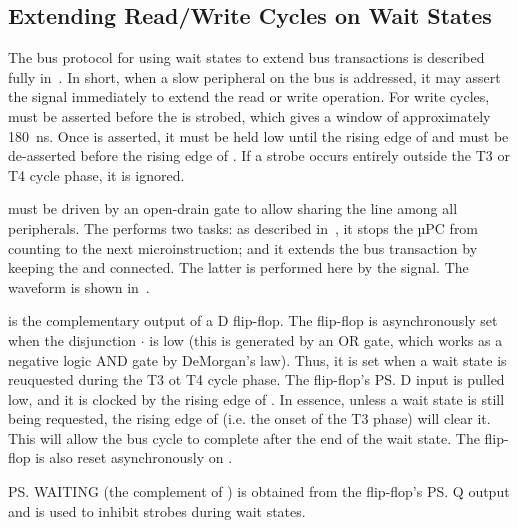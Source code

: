 \subsection{Extending Read/Write Cycles on Wait States}
\label{sec:dbus-driver-waiting}

The bus protocol for using wait states to extend bus transactions is described
fully in~. In short, when a slow peripheral on the bus is
addressed, it may assert the  signal immediately to extend the read or
write operation. For write cycles,  must be asserted before the 
is strobed, which gives a window of approximately 180~ns. Once  is
asserted, it must be held low until the rising edge of  and must be
de-asserted before the rising edge of . If a  strobe occurs
entirely outside the T3 or T4 cycle phase, it is ignored.

 must be driven by an open-drain gate to allow sharing the line among
all peripherals. The  performs two tasks: as described in~,
it stops the µPC from counting to the next microinstruction; and it extends the
bus transaction by keeping the \IBUS{} and \DBUS{} connected. The latter is
performed here by the  signal. The waveform is shown
in~.

 is the complementary output of a  D flip-flop. The flip-flop
is asynchronously set when the disjunction $\cdot$ is low (this
is generated by an OR gate, which works as a negative logic AND gate by
DeMorgan's law). Thus, it is set when a wait state is reuquested during the T3
ot T4 cycle phase. The flip-flop's \ps{D} input is pulled low, and it is
clocked by the rising edge of . In essence, unless a wait state is
still being requested, the rising edge of  (i.e. the onset of the T3
phase) will clear it. This will allow the bus cycle to complete after the end
of the wait state. The flip-flop is also reset asynchronously on .

\ps{WAITING} (the complement of ) is obtained from the flip-flop's
\ps{Q} output and is used to inhibit  strobes during wait states.




